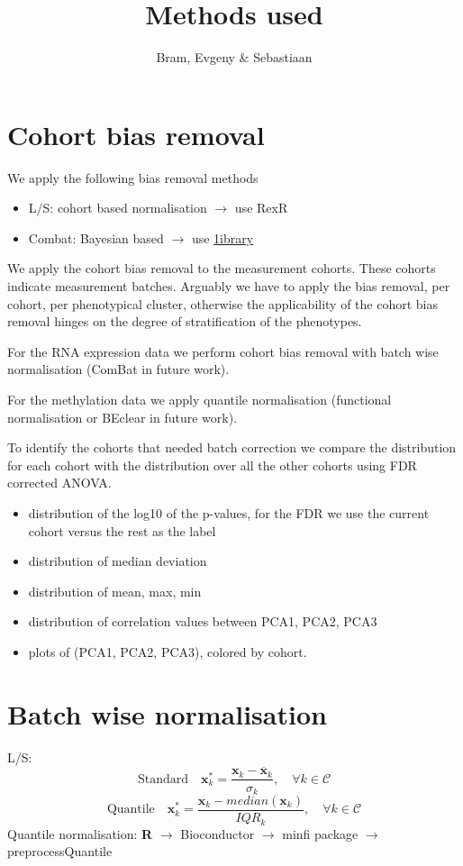 \documentclass[a4paper,10pt]{article}
\title{Methods used}
\author{Bram, Evgeny \& Sebastiaan}
\begin{document}
\section{Cohort bias removal}
%
We apply the following bias removal methods
%
\begin{itemize}
\item L/S: cohort based normalisation $\rightarrow$ use RexR
\item Combat: Bayesian based $\rightarrow$ use \href{http://www.bu.edu/jlab/wp-assets/ComBat/Abstract.html}{1ibrary} 
\end{itemize}

We apply the cohort bias removal to the measurement cohorts. These cohorts indicate measurement batches.
%
Arguably we have to apply the bias removal, per cohort, per phenotypical cluster, otherwise
the applicability of the cohort bias removal hinges on the degree of stratification of the phenotypes.

For the RNA expression data we perform cohort bias removal with batch wise normalisation (ComBat in future work).

For the methylation data we apply quantile normalisation (functional normalisation or BEclear in future work).

To identify the cohorts that needed batch correction we compare the distribution for each cohort 
with the distribution over all the other cohorts using FDR corrected ANOVA.

\begin{itemize}
\item distribution of the log10 of the p-values, for the FDR we use the current cohort versus the rest as the label
\item distribution of median deviation
\item distribution of mean, max, min 
\item distribution of correlation values between PCA1, PCA2, PCA3
\item plots of (PCA1, PCA2, PCA3), colored by cohort.
\end{itemize}
%

\section{Batch wise normalisation}
%
L/S:
\begin{equation}
\mbox{Standard}\quad \mathbf{x}^*_k= \frac{\mathbf{x}_k-\overline{\mathbf{x}}_k}{\sigma_k},\quad \forall k\in \mathcal{C}
\end{equation}
\begin{equation}
\mbox{Quantile}\quad \mathbf{x}^*_k= \frac{\mathbf{x}_k-median{(\mathbf{x}_k)}}{IQR_k},\quad \forall k\in \mathcal{C}
\end{equation}
%
Quantile normalisation: \textbf{R} $\rightarrow$ Bioconductor $\rightarrow$ minfi package $\rightarrow$ preprocessQuantile
\end{document}
